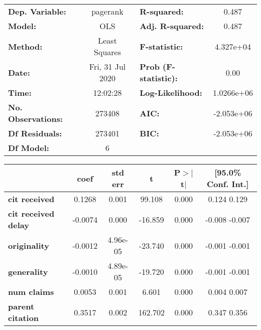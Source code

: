 \begin{center}
\begin{tabular}{lclc}
\toprule
\textbf{Dep. Variable:}     &     pagerank     & \textbf{  R-squared:         } &       0.487    \\
\textbf{Model:}             &       OLS        & \textbf{  Adj. R-squared:    } &       0.487    \\
\textbf{Method:}            &  Least Squares   & \textbf{  F-statistic:       } &   4.327e+04    \\
\textbf{Date:}              & Fri, 31 Jul 2020 & \textbf{  Prob (F-statistic):} &       0.00     \\
\textbf{Time:}              &     12:02:28     & \textbf{  Log-Likelihood:    } &   1.0266e+06   \\
\textbf{No. Observations:}  &      273408      & \textbf{  AIC:               } &   -2.053e+06   \\
\textbf{Df Residuals:}      &      273401      & \textbf{  BIC:               } &   -2.053e+06   \\
\textbf{Df Model:}          &           6      & \textbf{                     } &                \\
\bottomrule
\end{tabular}
\begin{tabular}{lccccc}
                            & \textbf{coef} & \textbf{std err} & \textbf{t} & \textbf{P$>$$|$t$|$} & \textbf{[95.0\% Conf. Int.]}  \\
\midrule
\textbf{cit received}       &       0.1268  &        0.001     &    99.108  &         0.000        &         0.124     0.129       \\
\textbf{cit received delay} &      -0.0074  &        0.000     &   -16.859  &         0.000        &        -0.008    -0.007       \\
\textbf{originality}        &      -0.0012  &     4.96e-05     &   -23.740  &         0.000        &        -0.001    -0.001       \\
\textbf{generality}         &      -0.0010  &     4.89e-05     &   -19.720  &         0.000        &        -0.001    -0.001       \\
\textbf{num claims}         &       0.0053  &        0.001     &     6.601  &         0.000        &         0.004     0.007       \\
\textbf{parent citation}    &       0.3517  &        0.002     &   162.702  &         0.000        &         0.347     0.356       \\

\end{tabular}
\end{center}
